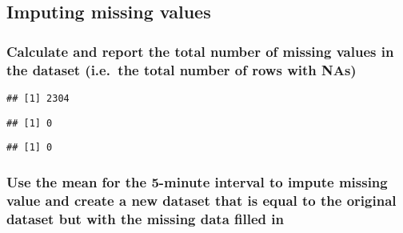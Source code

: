 \documentclass[]{article}
\newenvironment{Shaded}{\begin{snugshade}}{\end{snugshade}}
\newcommand{\KeywordTok}[1]{\textcolor[rgb]{0.13,0.29,0.53}{\textbf{#1}}}
\newcommand{\CommentTok}[1]{\textcolor[rgb]{0.56,0.35,0.01}{\textit{#1}}}
\newcommand{\OperatorTok}[1]{\textcolor[rgb]{0.81,0.36,0.00}{\textbf{#1}}}
\newcommand{\NormalTok}[1]{#1}
\begin{document}
\subsection{Imputing missing values}\label{imputing-missing-values}

\subsubsection{Calculate and report the total number of missing values
in the dataset (i.e.~the total number of rows with
NAs)}\label{calculate-and-report-the-total-number-of-missing-values-in-the-dataset-i.e.the-total-number-of-rows-with-nas}

\begin{Shaded}
\end{Shaded}

\begin{verbatim}
## [1] 2304
\end{verbatim}

\begin{Shaded}
\end{Shaded}

\begin{verbatim}
## [1] 0
\end{verbatim}

\begin{Shaded}
\end{Shaded}

\begin{verbatim}
## [1] 0
\end{verbatim}

\subsubsection{Use the mean for the 5-minute interval to impute missing
value and create a new dataset that is equal to the original dataset but
with the missing data filled
in}\label{use-the-mean-for-the-5-minute-interval-to-impute-missing-value-and-create-a-new-dataset-that-is-equal-to-the-original-dataset-but-with-the-missing-data-filled-in}
\end{document}
